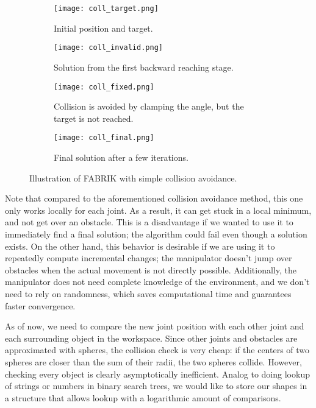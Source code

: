 \begin{figure}[h]
    \centering
    \begin{subfigure}{.24\textwidth}
      \texttt{[image: coll\_target.png]}
      \caption{Initial position and target.}
    \end{subfigure}
    \begin{subfigure}{0.24\textwidth}
      \texttt{[image: coll\_invalid.png]}
      \caption{Solution from the first backward reaching stage.}
    \end{subfigure}
    \begin{subfigure}{.24\textwidth}
      \texttt{[image: coll\_fixed.png]}
      \caption{Collision is avoided by clamping the angle, but the target is not reached.}
    \end{subfigure}
    \begin{subfigure}{.24\textwidth}
      \texttt{[image: coll\_final.png]}
      \caption{Final solution after a few iterations.}
    \end{subfigure}
    \caption{Illustration of FABRIK with simple collision avoidance.}\label{fig:coll}
\end{figure}
  
Note that compared to the aforementioned collision avoidance method, this one only works locally for each joint. As a result, it can get stuck in a local minimum, and not get over an obstacle. This is a disadvantage if we wanted to use it to immediately find a final solution; the algorithm could fail even though a solution exists. On the other hand, this behavior is desirable if we are using it to repeatedly compute incremental changes; the manipulator doesn't jump over obstacles when the actual movement is not directly possible. Additionally, the manipulator does not need complete knowledge of the environment, and we don't need to rely on randomness, which saves computational time and guarantees faster convergence.

As of now, we need to compare the new joint position with each other joint and each surrounding object in the workspace. Since other joints and obstacles are approximated with spheres, the collision check is very cheap: if the centers of two spheres are closer than the sum of their radii, the two spheres collide. However, checking every object is clearly asymptotically inefficient. Analog to doing lookup of strings or numbers in binary search trees, we would like to store our shapes in a structure that allows lookup with a logarithmic amount of comparisons.

